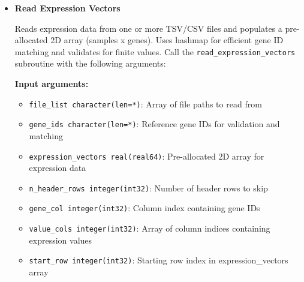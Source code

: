\documentclass[11pt]{article}
\begin{document}
\begin{enumerate}
\begin{enumerate}
\begin{itemize}
\begin{lstlisting}[language=Fortran, caption={Read Gene IDs from TSV File}]
integer(int32) :: ierr

call read_gene_ids_from_tsv_file('expression_data.tsv', &
                             gene_ids, 1, 1, ierr)
	      	      	      \end{lstlisting}
	      	      	      
	      	      	\item \textbf{Read Expression Vectors}
	      	      	      
	      	      	      Reads expression data from one or more TSV/CSV files and populates
	      	      	      a pre-allocated 2D array (samples x genes). Uses hashmap for
	      	      	      efficient gene ID matching and validates for finite values. Call the
	      	      	      \texttt{read\_expression\_vectors} subroutine with the following
	      	      	      arguments:
	      	      	      
	      	      	      \textbf{Input arguments:}
	      	      	      \begin{itemize}
	      	      	      	\item \texttt{file\_list character(len=*)}: Array of file paths to
	      	      	      	      read from
	      	      	      	      
	      	      	      	\item \texttt{gene\_ids character(len=*)}: Reference gene IDs for
	      	      	      	      validation and matching
	      	      	      	      
	      	      	      	\item \texttt{expression\_vectors real(real64)}: Pre-allocated 2D
	      	      	      	      array for expression data
	      	      	      	      
	      	      	      	\item \texttt{n\_header\_rows integer(int32)}: Number of header rows
	      	      	      	      to skip
	      	      	      	      
	      	      	      	\item \texttt{gene\_col integer(int32)}: Column index containing
	      	      	      	      gene IDs
	      	      	      	      
	      	      	      	\item \texttt{value\_cols integer(int32)}: Array of column indices
	      	      	      	      containing expression values
	      	      	      	      
	      	      	      	\item \texttt{start\_row integer(int32)}: Starting row index in expression\_vectors
	      	      	      	      array
	      	      	      	      

\end{itemize}
\end{itemize}
\end{enumerate}
\end{enumerate}
\end{document}
